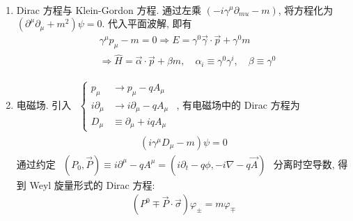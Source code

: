 \documentclass[../../main.tex]{subfiles}
\begin{document}
\begin{enumerate}
\begin{align*}
    \end{align*}
    \begin{enumerate}
        \item Dirac 方程与 Klein-Gordon 方程. 通过左乘 $(-i\gamma^{\mu}\partial_{mu}-m)$, 将方程化为 $(\partial^{\mu}\partial_{\mu} + m^{2})\psi = 0$. 代入平面波解, 即有
        \begin{align*}
            &\gamma^{\mu}p_{\mu} - m = 0\Rightarrow E = \gamma^{0}\vec{\gamma}\cdot\vec{p} + \gamma^{0}m\\
            &\Rightarrow \hat{H} = \vec{\alpha}\cdot \vec{p} + \beta m,\quad \alpha_{i}\equiv \gamma^{0}\gamma^{i}, \quad \beta\equiv \gamma^{0}
        \end{align*}
        \item 电磁场. 引入 $\begin{aligned}
            \left\{\begin{aligned}
                p_{\mu}&\rightarrow p_{\mu} - qA_{\mu}\\
                i\partial_{\mu}&\rightarrow i\partial_{\mu}-qA_{\mu}\\
                D_{\mu}&\equiv \partial_{\mu} + iqA_{\mu}
            \end{aligned}\right.
        \end{aligned}$, 有电磁场中的 Dirac 方程为
        \begin{align*}
            (i\gamma^{\mu}D_{\mu}-m)\psi = 0
        \end{align*}
        通过约定 $\begin{aligned}
            (P_{0},\vec{P})\equiv i\partial^{\mu} - qA^{\mu} = (i\partial_{t}-q\phi,-i\nabla-q\vec{A})
        \end{aligned}$ 分离时空导数, 得到 Weyl 旋量形式的 Dirac 方程:
        \begin{align*}
            (P^{0}\mp\vec{P}\cdot\vec{\sigma})\varphi_{\pm} = m\varphi_{\mp}
        \end{align*}
    \end{enumerate}
\end{enumerate}
\end{document}

